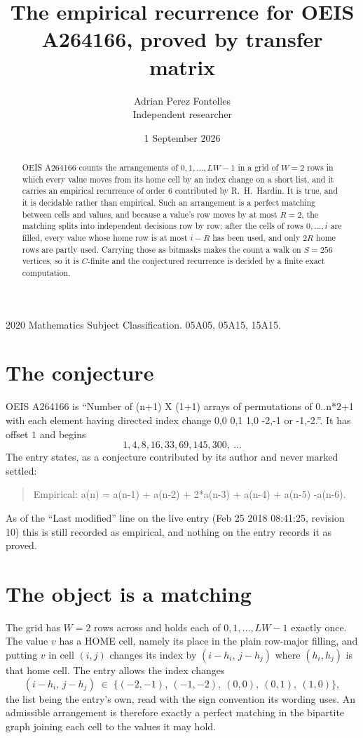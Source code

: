 \documentclass[11pt,a4paper]{article}
\title{The empirical recurrence for OEIS A264166, proved by transfer matrix}
\author{Adrian Perez Fontelles\\ \small Independent researcher}
\date{1 September 2026}
\theoremstyle{plain}
\theoremstyle{definition}
\begin{document}
\maketitle

\begin{abstract}
OEIS A264166 counts the arrangements of $0,1,\dots,LW-1$ in a grid of $W=2$ rows in which
every value moves from its home cell by an index change on a short list, and it carries an
empirical recurrence of order $6$ contributed by R.~H.~Hardin. It is true, and it is
decidable rather than empirical. Such an arrangement is a perfect matching between cells and
values, and because a value's row moves by at most $R=2$, the matching splits into
independent decisions row by row: after the cells of rows $0,\dots,i$ are filled,
every value whose home row is at most $i-R$ has been used, and only $2R$ home rows are
partly used. Carrying those as bitmasks makes the count a walk on $S=256$ vertices, so it is
$C$-finite and the conjectured recurrence is decided by a finite exact computation.
\end{abstract}

\noindent\small 2020 Mathematics Subject Classification. 05A05, 05A15, 15A15.\normalsize

\section{The conjecture}

OEIS A264166 is ``Number of (n+1) X (1+1) arrays of permutations of 0..n*2+1 with each element having directed index change 0,0 0,1 1,0 -2,-1 or -1,-2.''. It has offset $1$ and begins
\[
1, 4, 8, 16, 33, 69, 145, 300,\ \dots
\]
The entry states, as a conjecture contributed by its author and never marked settled:
\begin{quote}
Empirical: a(n) = a(n-1) + a(n-2) + 2*a(n-3) + a(n-4) + a(n-5) -a(n-6).
\end{quote}
As of the ``Last modified'' line on the live entry (Feb 25 2018 08:41:25, revision 10) this is still
recorded as empirical, and nothing on the entry records it as proved.

\section{The object is a matching}

The grid has $W=2$ rows across and holds each of $0,1,\dots,LW-1$ exactly once. The value
$v$ has a HOME cell, namely its place in the plain row-major filling, and putting $v$ in cell
$(i,j)$ changes its index by $(i-h_i,\,j-h_j)$ where $(h_i,h_j)$ is that home cell. The entry
allows the index changes
\[
(i-h_i,\,j-h_j)\;\in\;\{(-2,-1),\ (-1,-2),\ (0,0),\ (0,1),\ (1,0)\},
\]
the list being the entry's own, read with the sign convention its wording uses. An admissible
arrangement is therefore exactly a perfect matching in the bipartite graph joining each cell to
the values it may hold.
\end{document}
